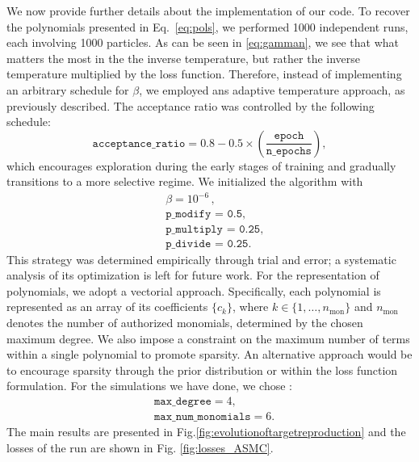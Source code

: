 \documentclass[11pt]{article}
\begin{document}
We now provide further details about the implementation of our code. To recover the polynomials presented in Eq.~\eqref{eq:pols}, we performed 1000 independent runs, each involving 1000 particles. As can be seen in \eqref{eq:gamman}, we see that what matters the most in the the inverse temperature, but rather the inverse temperature multiplied by the loss function. Therefore, instead of implementing an arbitrary schedule for $\beta$, we employed ans adaptive temperature approach, as previously described. The acceptance ratio was controlled by the following schedule:
\begin{equation}
	\texttt{acceptance\_ratio} = 0.8 - 0.5 \times \left(\frac{\texttt{epoch}}{\texttt{n\_epochs}}\right),
\end{equation}
which encourages exploration during the early stages of training and gradually transitions to a more selective regime. We initialized the algorithm with 
\begin{equation}\label{eq:sample10000adaptativetemp}
	\begin{aligned}
		&\beta = 10^{-6}\,, \\
		&\texttt{p\_{modify} = 0.5},\\
		&\texttt{p\_{multiply} = 0.25},\\
		&\texttt{p\_{divide} = 0.25}. 
	\end{aligned}
\end{equation}
This strategy was determined empirically through trial and error; a systematic analysis of its optimization is left for future work. For the representation of polynomials, we adopt a vectorial approach. Specifically, each polynomial is represented as an array of its coefficients $\{c_k\}$, where $k \in \{1,\dots,n_{\text{mon}}\}$ and $n_{\text{mon}}$ denotes the number of authorized monomials, determined by the chosen maximum degree. We also impose a constraint on the maximum number of terms within a single polynomial to promote sparsity. An alternative approach would be to encourage sparsity through the prior distribution or within the loss function formulation. For the simulations we have done, we chose : 
\begin{equation}
	\begin{aligned}
	&\texttt{max\_degree} = 4,\\
	&\texttt{max\_num\_monomials} = 6.
\end{aligned}
\end{equation}
The main results are presented in Fig.\eqref{fig:evolutionoftargetreproduction} and the losses of the run are shown in Fig. \ref{fig:losses_ASMC}. 
\end{document}
